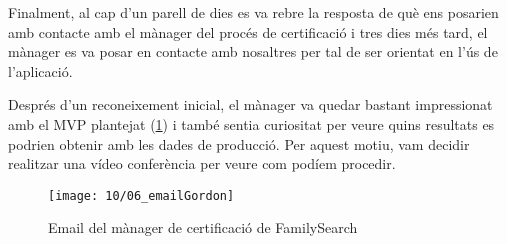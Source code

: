     Finalment, al cap d’un parell de dies es va rebre la resposta de què ens posarien amb contacte amb el mànager del procés de certificació i tres dies més tard, el mànager es va posar en contacte amb nosaltres per tal de ser orientat en l’ús de l’aplicació.

    Després d’un reconeixement inicial, el mànager va quedar bastant impressionat amb el MVP plantejat (\ref{fig:gordonEmail}) i també sentia curiositat per veure quins resultats es podrien obtenir amb les dades de producció. Per aquest motiu, vam decidir realitzar una vídeo conferència per veure com podíem procedir.

    \begin{figure}[h]
        \texttt{[image: 10/06\_emailGordon]}
        \centering
        \caption{Email del mànager de certificació de FamilySearch}\label{fig:gordonEmail}
    \end{figure}
